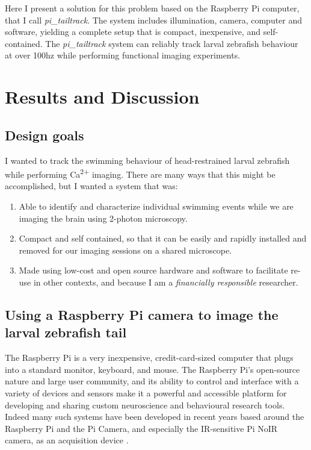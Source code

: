 \documentclass[9pt,lineno]{RandlettLab_elife}
\begin{document}
Here I present a solution for this problem based on the Raspberry Pi computer, that I call \emph{pi\_tailtrack}. The system includes illumination, camera, computer and software, yielding a complete setup that is compact, inexpensive, and self-contained. The \emph{pi\_tailtrack} system can reliably track larval zebrafish behaviour at over 100hz while performing functional imaging experiments. 

\newpage
\section{Results and Discussion}

\subsection{Design goals}

I wanted to track the swimming behaviour of head-restrained larval zebrafish while performing Ca\textsuperscript{2+} imaging. There are many ways that this might be accomplished, but I wanted a system that was: 
\begin{enumerate}
    \item Able to identify and characterize individual swimming events while we are imaging the brain using 2-photon microscopy.
    \item Compact and self contained, so that it can be easily and rapidly installed and removed for our imaging sessions on a shared microscope.
    \item Made using low-cost and open source hardware and software to facilitate re-use in other contexts, and because I am a  \emph{financially responsible} researcher.

\end{enumerate}

\subsection{Using a Raspberry Pi camera to image the larval zebrafish tail}

The Raspberry Pi is a very inexpensive, credit-card-sized computer that plugs into a standard monitor, keyboard, and mouse. The Raspberry Pi's open-source nature and large user community, and its ability to control and interface with a variety of devices and sensors make it a powerful and accessible platform for developing and sharing custom neuroscience and behavioural research tools. Indeed many such systems have been developed in recent years based around the Raspberry Pi and the Pi Camera, and especially the IR-sensitive Pi NoIR camera, as an acquisition device \citep{Geissmann2017-gd, Maia_Chagas2017-mf, Saunders2019-ka, Tadres2020-as, Broussard2022-yd}. 
\end{document}

